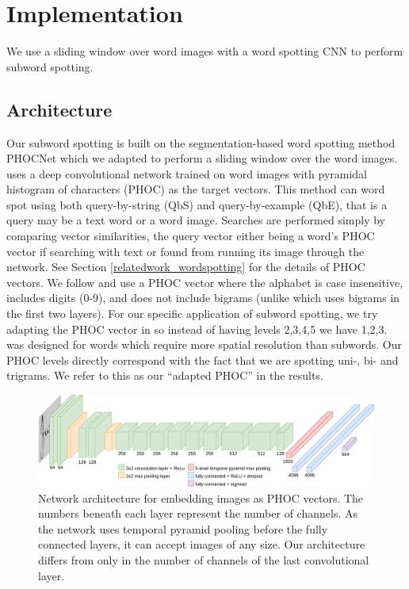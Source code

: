 \documentclass[ms,electronic,twosidetoc,letterpaper,chaptercenter,parttop,lof,lot]{byumsphd}
\begin{document}
\section{Implementation}

We use a sliding window over word images with a word spotting CNN to perform subword spotting.

\subsection{Architecture}

Our subword spotting is built on the segmentation-based word spotting method PHOCNet \cite{sudholt2016, sudholt2017} which we adapted to perform a sliding window over the word images. \cite{sudholt2017} uses a deep convolutional network trained on word images with pyramidal histogram of characters (PHOC) \cite{Almazan2014} as the target vectors. This method can word spot using both query-by-string (QbS) and query-by-example (QbE), that is a query may be a text word or a word image. Searches are performed simply by comparing vector similarities, the query vector either being a word's PHOC vector if searching with text or found from running its image through the network. See Section \ref{relatedwork_wordspotting} for the details of PHOC vectors. We follow \cite{sudholt2017} and use a PHOC vector where the alphabet is case insensitive, includes digits (0-9), and does not include bigrams (unlike \cite{Almazan2014} which uses bigrams in the first two layers). For our specific application of subword spotting, we try adapting the PHOC vector in \cite{sudholt2017} so instead of having levels 2,3,4,5 we have 1,2,3. \cite{sudholt2017} was designed for words which require more spatial resolution than subwords. Our PHOC levels directly correspond with the fact that we are spotting uni-, bi- and trigrams. We refer to this as our ``adapted PHOC'' in the results.

\begin{figure}
    \centering
    \includegraphics[width=.98\textwidth]{thesis-phocnet}
    \caption{Network architecture for embedding images as PHOC vectors. The numbers beneath each layer represent the number of channels. As the network uses temporal pyramid pooling before the fully connected layers, it can accept images of any size. Our architecture differs from \cite{sudholt2017} only in the number of channels of the last convolutional layer.}
    \label{fig:network}
\end{figure}
\end{document}
